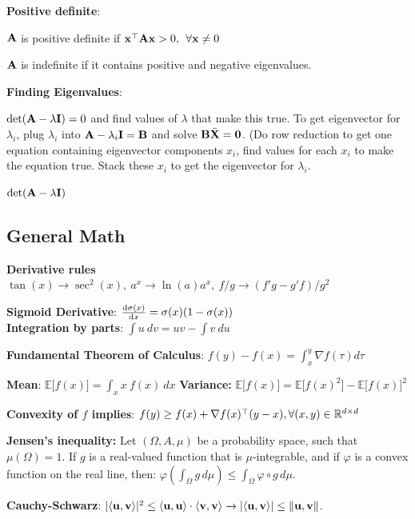 \textbf{Positive definite}:

\tab$\mathbf A$ is positive definite if $\mathbf x^{\mathop{\mathrm{\top}}}\mathbf A\mathbf x > 0,\>\> \forall \mathbf x\neq0$

\tab$\mathbf A$ is indefinite if it contains positive and negative eigenvalues.

\textbf{Finding Eigenvalues}:

\tab $\det(\mathbf A - \lambda \mathbf I)=0$ and find values of $\lambda$ that make this true. To get eigenvector for $\lambda_i$, plug $\lambda_i$ into $\mathbf A - \lambda_i \mathbf I = \mathbf B$ and solve $\mathbf B\bar{\mathbf X}=\mathbf{0}$. (Do row reduction to get one equation containing eigenvector components $x_i$, find values for each $x_i$ to make the equation true. Stack these $x_i$ to get the eigenvector for $\lambda_i$. 

\tab $\det(\mathbf A - \lambda \mathbf I)$

\subsection*{General Math}
\textbf{Derivative rules}\\
$\tan(x)\xrightarrow{}\sec^2(x),\>a^x\xrightarrow{}\ln(a)a^x,\>f/g\xrightarrow{}(f'g-g'f)/g^2$



\textbf{Sigmoid Derivative}: $\dv{\sigma(x)}{x} = \sigma(x)(1-\sigma(x))$\\

\textbf{Integration by parts}: $\int u\>dv=uv - \int v\>du$

\textbf{Fundamental Theorem of Calculus}: $f(y)-f(x)=\int^y_x\nabla f(\tau) d\tau$

\textbf{Mean}: $\mathbb{E}\lbrack f(x) \rbrack = \int_x x\>f(x)\>dx$ \textbf{Variance:} $\mathbb{E}\lbrack f(x) \rbrack = \mathbb{E} \lbrack f(x)^2\rbrack - \mathbb{E} \lbrack f(x) \rbrack^2$

\textbf{Convexity of $f$ implies}: $f(y)\geq f(x)+\nabla f(x)^{\mathop{\mathrm{\top}}} (y-x), \forall (x,y) \in \mathbb R^{d\times d}$

\textbf{Jensen's inequality:} Let $(\Omega, A, \mu)$ be a probability space, such that $\mu(\Omega)= 1$. If $g$ is a real-valued function that is $\mu$-integrable, and if $\varphi$ is a convex function on the real line, then:
$\varphi\left(\int_\Omega g\, d\mu\right) \le \int_\Omega \varphi \circ g\, d\mu.$

\textbf{Cauchy-Schwarz}: $\lvert \langle \mathbf u ,\mathbf v \rangle\rvert^2\leq\langle \mathbf u,\mathbf u\rangle\cdot\langle\mathbf v,\mathbf v\rangle \xrightarrow{} \lvert\langle\mathbf u,\mathbf v\rangle\rvert\leq\lVert\mathbf u,\mathbf v\rVert $.

